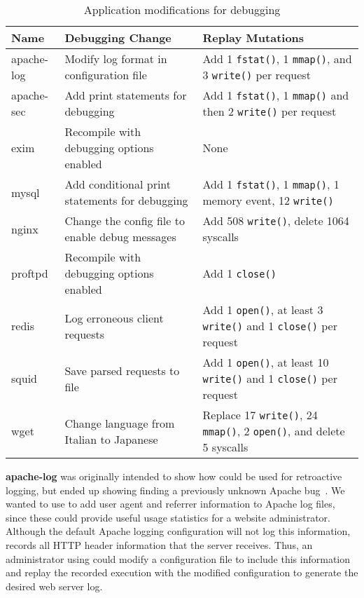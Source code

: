 \begin{table*}[t]
\begin{center}
\small
\begin{tabular}{|l|l|l|}   \hline
{\bf Name} & {\bf Debugging Change} & {\bf Replay Mutations} \\
\hline\hline 
		apache-log &
		Modify log format in configuration file &
		Add 1 {\tt fstat()}, 1 {\tt mmap()}, and 3 {\tt write()} per request
		\\
\hline
		apache-sec &
		Add print statements for debugging &
		Add 1 {\tt fstat()}, 1 {\tt mmap()} and then 2 {\tt write()} per
		request \\
\hline
		exim &
		Recompile with debugging options enabled &
		None \\
\hline
		mysql &
		Add conditional print statements for debugging &
		Add 1 {\tt fstat()}, 1 {\tt mmap()}, 1 memory event, 12 {\tt write()}
		\\
\hline
		nginx &
		Change the config file to enable debug messages &
		Add 508 {\tt write()}, delete 1064 syscalls \\
\hline
		proftpd &
		Recompile with debugging options enabled &
		Add 1 {\tt close()} \\
\hline
		redis &
		Log erroneous client requests &
		Add 1 {\tt open()}, at least 3 {\tt write()} and 1 {\tt close()} per request
		\\
\hline
		squid &
		Save parsed requests to file &
		Add 1 {\tt open()}, at least 10 {\tt write()} and 1 {\tt close()} per
		request \\
\hline
		wget &
		Change language from Italian to Japanese &
		Replace 17 {\tt write()}, 24 {\tt mmap()}, 2 {\tt open()}, and delete
		5 syscalls \\
\hline
\end{tabular}
\end{center}
\renewcommand\thetable{3}
\caption{Application modifications for debugging}
\label{tab:debugging}
\end{table*}

{\bf apache-log} was originally intended to show how {\dora} could be used
for retroactive logging, but ended up
showing {\dora} finding a previously unknown Apache bug~\cite{apache-bug-53131}.
We wanted to use {\dora} to add user agent and referrer information to Apache
log files, since these could provide useful usage statistics for a website
administrator. Although the default Apache logging configuration will not log
this information, {\dora} records all HTTP
header information that the server receives. Thus, an administrator using {\dora}
could modify a configuration file to include this information
and replay the recorded execution with the modified configuration
to generate the desired web server log.

